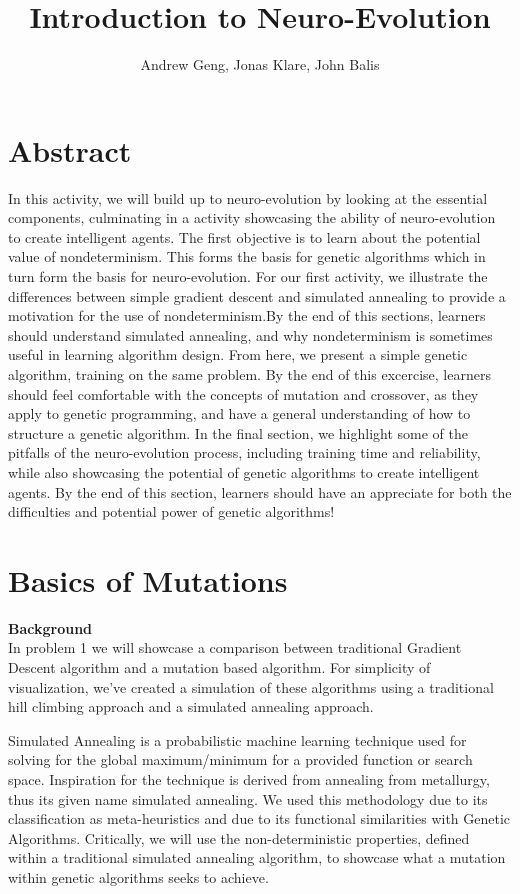 \documentclass[12]{extarticle}
\begin{document}
\title{Introduction to Neuro-Evolution}
\author{Andrew Geng, Jonas Klare, John Balis}




\maketitle

\section{Abstract}
In this activity, we will build up to neuro-evolution by looking at the essential components, culminating in a activity showcasing the ability of neuro-evolution to create intelligent agents. The first objective is to learn about the potential value of nondeterminism. This forms the basis for genetic algorithms which in turn form the basis for neuro-evolution. For our first activity, we illustrate the differences between simple gradient descent and simulated annealing to provide a motivation for the use of nondeterminism.By the end of this sections, learners should understand simulated annealing, and why nondeterminism is sometimes useful in learning algorithm design. From here, we present a simple genetic algorithm, training on the same problem. By the end of this excercise, learners should feel comfortable with the concepts of mutation and crossover, as they apply to genetic programming, and have a general understanding of how to structure a genetic algorithm. In the final section, we highlight some of the pitfalls of the neuro-evolution process, including training time and reliability, while also showcasing the potential of genetic algorithms to create intelligent agents. By the end of this section, learners should have an appreciate for both the difficulties and potential power of genetic algorithms!






\section{Basics of Mutations}
\textbf{Background} \\
In problem 1 we will showcase a comparison between traditional Gradient Descent algorithm and a mutation based algorithm. For simplicity of visualization, we’ve created a simulation of these algorithms using a traditional hill climbing approach and a simulated annealing approach.

Simulated Annealing is a probabilistic machine learning technique used for solving for the global maximum/minimum for a provided function or search space. Inspiration for the technique is derived from annealing from metallurgy, thus its given name simulated annealing\cite{Nahar}. We used this methodology due to its classification as meta-heuristics and due to its functional similarities with Genetic Algorithms. Critically, we will use the non-deterministic properties, defined within a traditional simulated annealing algorithm, to showcase what a mutation within genetic algorithms seeks to achieve.
\end{document}
